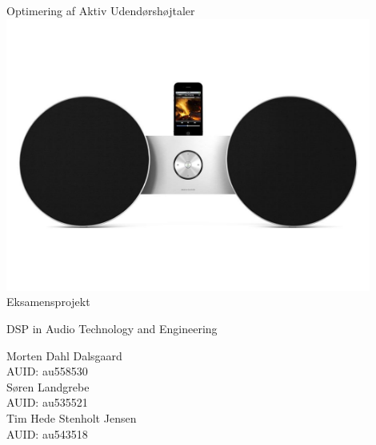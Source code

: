 


\fancyhead{}
\fancyfoot{}
\rfoot{\thepage}
\begin{center}
\begin{Huge}
\vspace*{0.5 cm}
Optimering af Aktiv Udendørshøjtaler \\
\vspace*{0.5cm}
\includegraphics[width=0.9\textwidth]{figur/frontpage2.jpg}\\
Eksamensprojekt\\
\end{Huge}
\begin{Large}
DSP in Audio Technology and Engineering\\
\vspace*{1 cm}
\end{Large}
\end{center}
\begin{center}
\begin{large}
Morten Dahl Dalsgaard\\
\vspace*{.2cm}
AUID: au558530\\
\vspace*{.6cm}
Søren Landgrebe\\
\vspace*{.2cm}
AUID: au535521\\
\vspace*{.6cm}
Tim Hede Stenholt Jensen\\
\vspace*{.2cm}
AUID: au543518\\
\end{large}
\end{center}
\pagebreak


